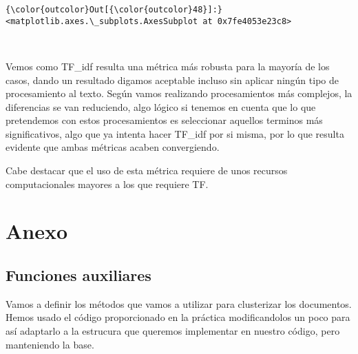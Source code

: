 \documentclass[11pt]{article}
\begin{document}
\begin{Verbatim}[commandchars=\\\{\}]
{\color{outcolor}Out[{\color{outcolor}48}]:} <matplotlib.axes.\_subplots.AxesSubplot at 0x7fe4053e23c8>
\end{Verbatim}

    \begin{center}
    \end{center}
    { \hspace*{\fill} \\}

    Vemos como TF\_idf resulta una métrica más robusta para la mayoría de
los casos, dando un resultado digamos aceptable incluso sin aplicar
ningún tipo de procesamiento al texto. Según vamos realizando
procesamientos más complejos, la diferencias se van reduciendo, algo
lógico si tenemos en cuenta que lo que pretendemos con estos
procesamientos es seleccionar aquellos terminos más significativos, algo
que ya intenta hacer TF\_idf por si misma, por lo que resulta evidente
que ambas métricas acaben convergiendo.

Cabe destacar que el uso de esta métrica requiere de unos recursos
computacionales mayores a los que requiere TF.

    \section{Anexo}

     \subsection{Funciones auxiliares}

    Vamos a definir los métodos que vamos a utilizar para clusterizar los
documentos. Hemos usado el código proporcionado en la práctica
modificandolos un poco para así adaptarlo a la estrucura que queremos
implementar en nuestro código, pero manteniendo la base.
\end{document}
